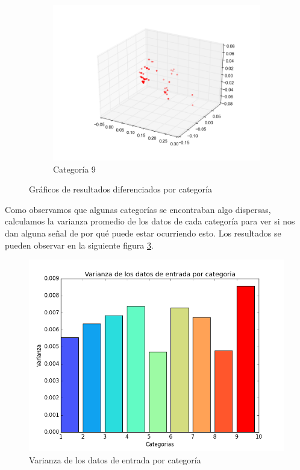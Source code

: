 \begin{figure}[H]
\begin{subfigure}[b]{0.33\textwidth}
                \includegraphics[width=\linewidth]{secciones/graficos/oja/categoria_9.png}
                \caption{Categoría 9}
                \label{fig: ej1_oja_categoria_9}
        \end{subfigure}
        \caption{Gráficos de resultados diferenciados por categoría}
        \label{fig: ej1_oja_categorias}
\end{figure}


\par Como observamos que algunas categorías se encontraban algo dispersas, calculamos la varianza promedio de los datos de cada categoría para ver si nos dan alguna señal de por qué puede estar ocurriendo esto. Los resultados se pueden observar en la siguiente figura \ref{fig: varianza_entrada}.

\begin{figure}[H]
        \centering
        \includegraphics[width=0.8\linewidth]{secciones/graficos/varianza_entrada.png}
        \caption{Varianza de los datos de entrada por categoría}
        \label{fig: varianza_entrada}
\end{figure}

